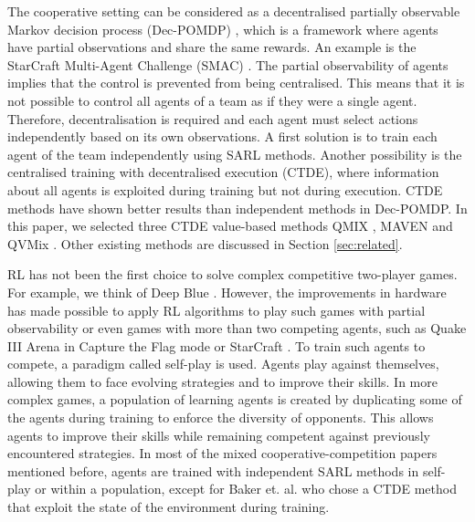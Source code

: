The cooperative setting can be considered as a decentralised partially observable Markov decision process (Dec-POMDP) \citep{DecPomdp}, which is a framework where agents have partial observations and share the same rewards.
An example is the StarCraft Multi-Agent Challenge (SMAC) \citep{samvelyan2019starcraft}.
The partial observability of agents implies that the control is prevented from being centralised.
This means that it is not possible to control all agents of a team as if they were a single agent.
Therefore, decentralisation is required and each agent must select actions independently based on its own observations.
A first solution is to train each agent of the team independently using SARL methods.
Another possibility is the centralised training with decentralised execution (CTDE), where information about all agents is exploited during training but not during execution.
CTDE methods have shown better results than independent methods in Dec-POMDP.
In this paper, we selected three CTDE value-based methods QMIX \citep{Rashid2018}, MAVEN \citep{Mahajan2019MAVEN:Exploration} and QVMix \citep{leroy2020qvmix}. Other existing methods are discussed in Section \ref{sec:related}.

RL has not been the first choice to solve complex competitive two-player games.
For example, we think of Deep Blue \citep{campbell2002deep}.
However, the improvements in hardware has made possible to apply RL algorithms to play such games with partial observability \citep{silver2018general} or even games with more than two competing agents, such as Quake III Arena in Capture the Flag mode \citep{jaderberg2019human} or StarCraft \citep{vinyals2019grandmaster}.
To train such agents to compete, a paradigm called self-play is used.
Agents play against themselves, allowing them to face evolving strategies and to improve their skills.
In more complex games, a population of learning agents is created by duplicating some of the agents during training to enforce the diversity of opponents.
This allows agents to improve their skills while remaining competent against previously encountered strategies.
In most of the mixed cooperative-competition papers mentioned before, agents are trained with independent SARL methods in self-play or within a population, except for Baker et. al. \cite{baker2019emergent} who chose a CTDE method that exploit the state of the environment during training.

